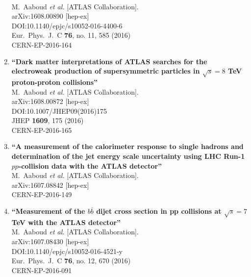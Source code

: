 \documentclass{article}
\begin{document}
\begin{enumerate}
  \\{}M.~Aaboud {\it et al.} [ATLAS Collaboration].
  \\{}arXiv:1608.00890 [hep-ex]
  \\{}DOI:10.1140/epjc/s10052-016-4400-6
  \\{}Eur.\ Phys.\ J.\ C {\bf 76}, no. 11, 585 (2016)
  \\{}CERN-EP-2016-164
\item%
{\bf ``Dark matter interpretations of ATLAS searches for the electroweak production of supersymmetric particles in $ \sqrt{s}=8 $ TeV proton-proton collisions''}
  \\{}M.~Aaboud {\it et al.} [ATLAS Collaboration].
  \\{}arXiv:1608.00872 [hep-ex]
  \\{}DOI:10.1007/JHEP09(2016)175
  \\{}JHEP {\bf 1609}, 175 (2016)
  \\{}CERN-EP-2016-165
\item%
{\bf ``A measurement of the calorimeter response to single hadrons and determination of the jet energy scale uncertainty using LHC Run-1 $pp$-collision data with the ATLAS detector''}
  \\{}M.~Aaboud {\it et al.} [ATLAS Collaboration].
  \\{}arXiv:1607.08842 [hep-ex]
  \\{}CERN-EP-2016-149
\item%
{\bf ``Measurement of the $b\overline{b}$ dijet cross section in pp collisions at $\sqrt{s} = 7$  TeV with the ATLAS detector''}
  \\{}M.~Aaboud {\it et al.} [ATLAS Collaboration].
  \\{}arXiv:1607.08430 [hep-ex]
  \\{}DOI:10.1140/epjc/s10052-016-4521-y
  \\{}Eur.\ Phys.\ J.\ C {\bf 76}, no. 12, 670 (2016)
  \\{}CERN-EP-2016-091

\end{enumerate}
\end{document}
